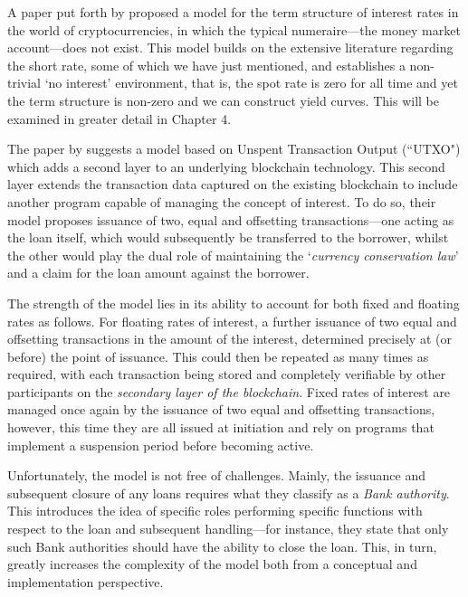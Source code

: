 A paper put forth by \cite{brody2020theory} proposed a model for the term structure of interest rates in the world of cryptocurrencies, in which the typical numeraire––the money market account––does not exist. This model builds on the extensive literature regarding the short rate, some of which we have just mentioned, and establishes a non-trivial `no interest' environment, that is, the spot rate is zero for all time and yet the term structure is non-zero and we can construct yield curves. This will be examined in greater detail in Chapter 4.

The paper by \cite{kaneko2019management} suggests a model based on Unspent Transaction Output (``UTXO") which adds a second layer to an underlying blockchain technology. This second layer extends the transaction data captured on the existing blockchain to include another program capable of managing the concept of interest. To do so, their model proposes issuance of two, equal and offsetting transactions––one acting as the loan itself, which would subsequently be transferred to the borrower, whilst the other would play the dual role of maintaining the `\textit{currency conservation law}' and a claim for the loan amount against the borrower. 

The strength of the model lies in its ability to account for both fixed and floating rates as follows. For floating rates of interest, a further issuance of two equal and offsetting transactions in the amount of the interest, determined precisely at (or before) the point of issuance. This could then be repeated as many times as required, with each transaction being stored and completely verifiable by other participants on the \textit{secondary layer of the blockchain}. Fixed rates of interest are managed once again by the issuance of two equal and offsetting transactions, however, this time they are all issued at initiation and rely on programs that implement a suspension period before becoming active. 

Unfortunately, the model is not free of challenges. Mainly, the issuance and subsequent closure of any loans requires what they classify as a \textit{Bank authority}. This introduces the idea of specific roles performing specific functions with respect to the loan and subsequent handling––for instance, they state that only such Bank authorities should have the ability to close the loan. This, in turn, greatly increases the complexity of the model both from a conceptual and implementation perspective. 


